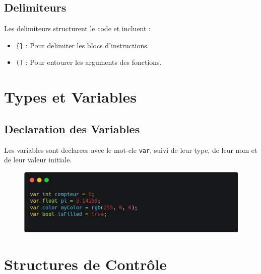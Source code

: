 \documentclass[12pt,a4paper]{report}
\begin{document}
\subsection{Delimiteurs}
Les delimiteurs structurent le code et incluent :
\begin{itemize}
    \item \texttt{\{\}} : Pour delimiter les blocs d'instructions.
    \item \texttt{()} : Pour entourer les arguments des fonctions.
\end{itemize}

\section{Types et Variables}

\subsection{Declaration des Variables}
Les variables sont declarees avec le mot-cle \texttt{var}, suivi de leur type, de leur nom et de leur valeur initiale.
\begin{figure}[H]
    \includegraphics[width=1\linewidth]{assets/code/variables.png}
\end{figure}


\section{Structures de Contrôle}
\end{document}

